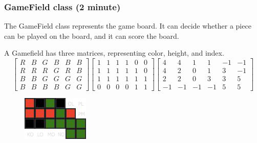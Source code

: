 \documentclass{beamer}
\begin{document}
\begin{frame}
\frametitle{GameField class (2 minute)}
The GameField class represents the game board. It can decide whether a piece can be played on the board, and it can score the board.

A Gamefield has three matrices, representing color, height, and index.
\tiny\[
  \begin{bmatrix}
    R & B & G & B & B & B \\ 
    R & R & R & G & R & B \\ 
    B & B & G & G & G & G \\ 
    B & B & B & B & G & G
  \end{bmatrix}
  \begin{bmatrix}
    1 & 1 & 1 & 1 & 0 & 0 \\ 
    1 & 1 & 1 & 1 & 1 & 0 \\ 
    1 & 1 & 1 & 1 & 1 & 1 \\ 
    0 & 0 & 0 & 0 & 1 & 1
  \end{bmatrix}
  \begin{bmatrix}
     4 &  4 &  1 &  1 & -1 & -1 \\ 
     4 &  2 &  0 &  1 &  3 & -1 \\ 
     2 &  2 &  0 &  3 &  3 &  5 \\ 
    -1 & -1 & -1 & -1 &  5 &  5
  \end{bmatrix}
\]
\begin{figure}
\includegraphics[width=0.4\linewidth]{5}
\end{figure}
\end{frame}
\end{document}
